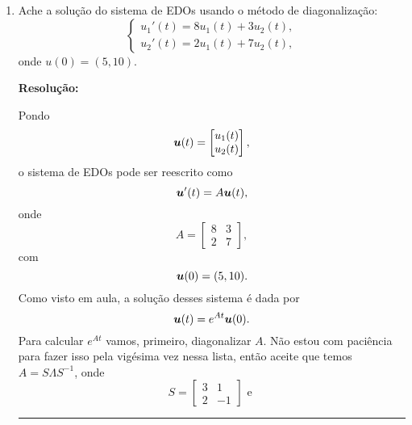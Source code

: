 \documentclass[leqno]{article}
\numberwithin{equation}{section}
\newenvironment{sol} 
{
    \vspace{4mm}
    \noindent\textbf{Resolução:}
    \strut\newline
    \smallskip
    \hspace{-3.5mm} 
} 
{\noindent\rule{4cm}{.1mm}}
\begin{document}
\begin{enumerate}
\begin{sol}
\end{sol}


\item Ache a solução do sistema de EDOs usando o método de diagonalização:
$$\begin{cases}
u_1'(t) = 8u_1(t) + 3u_2(t),\\
u_2'(t) = 2u_1(t) + 7u_2(t),
\end{cases}$$
onde $u(0) = (5, 10)$.

\begin{sol}

    Pondo
    \begin{equation*}
        \boldsymbol{u} ( t ) =
        \begin{bmatrix}
            u_{ 1 } ( t ) \\
            u_{ 2 } ( t )
        \end{bmatrix}
    ,\end{equation*}
    o sistema de EDOs pode ser reescrito como
    \begin{equation*}
        \boldsymbol{u}'( t ) = A \boldsymbol{u} ( t )
    ,\end{equation*}
    onde
    \begin{equation*}
        A =
        \begin{bmatrix}
            8 & 3 \\
            2 & 7
        \end{bmatrix}
    ,\end{equation*}
    com
    \begin{equation*}
        \boldsymbol{u} ( 0 ) = ( 5, 10 )
    .\end{equation*}
    Como visto em aula, a solução desses sistema é dada por
    \begin{equation*}
        \boldsymbol{u} ( t ) = e^{ At } \boldsymbol{u} ( 0 )
    .\end{equation*}
    Para calcular \( e^{ At } \) vamos, primeiro, diagonalizar \( A \).
    Não estou com paciência para fazer isso pela vigésima vez nessa lista, então aceite que temos \( A = S \Lambda S^{ -1 } \), onde
    \begin{equation*}
        S =
        \begin{bmatrix}
            3 & 1 \\
            2 & -1
        \end{bmatrix}
        \text{ e }

\end{equation*}
\end{sol}
\end{enumerate}
\end{document}
